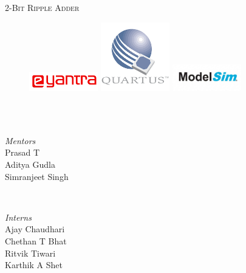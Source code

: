 \documentclass[12pt,singleside,a4paper]{article}
\begin{document}
 

\begin{titlepage}
	\centering
    \textsc{\LARGE 2-Bit Ripple Adder}\\[2.0 cm]
\begin{figure}[!htb]
\centering
  \includegraphics[width=3cm,keepaspectratio]{logo.png}\textbf{ }\textbf{  }
  \includegraphics[width=3cm,keepaspectratio]{download.png}\textbf{  }
  \includegraphics[width=3cm,keepaspectratio]{modelsim-logo.jpg}
\end{figure}	\\[2cm]\
	\begin{minipage}{0.4\textwidth}
		\begin{flushleft} \large
			\emph{Mentors}\\
			Prasad T\\
            Aditya Gudla\\
            Simranjeet Singh \
			\end{flushleft}
			\end{minipage}~
			\begin{minipage}{0.4\textwidth}
            
			\begin{flushright} \large
			\emph{Interns} \\
			Ajay Chaudhari\\
            Chethan T Bhat\\
            Ritvik Tiwari \\
            Karthik A Shet \\
		\end{flushright}
	\end{minipage}\\[2 cm]
\end{titlepage}
\newpage
\tableofcontents
\newpage
{}
\end{document}
